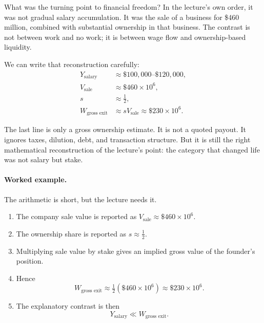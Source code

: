 What was the turning point to financial freedom? In the lecture's own order, it was not gradual salary accumulation. It was the sale of a business for \$460 million, combined with substantial ownership in that business. The contrast is not between work and no work; it is between wage flow and ownership-based liquidity.

We can write that reconstruction carefully:
\begin{align}
Y_{\text{salary}} &\approx \$100{,}000\text{--}\$120{,}000,\\
V_{\text{sale}} &\approx \$460\times 10^6,\\
s &\approx \tfrac12,\\
W_{\text{gross exit}} &\approx sV_{\text{sale}} \approx \$230\times 10^6.
\end{align}

The last line is only a gross ownership estimate. It is not a quoted payout. It ignores taxes, dilution, debt, and transaction structure. But it is still the right mathematical reconstruction of the lecture's point: the category that changed life was not salary but stake.

\paragraph{Worked example.}
The arithmetic is short, but the lecture needs it.
\begin{enumerate}
\item The company sale value is reported as \(V_{\text{sale}} \approx \$460\times 10^6\).
\item The ownership share is reported as \(s \approx \tfrac12\).
\item Multiplying sale value by stake gives an implied gross value of the founder's position.
\item Hence
\[
W_{\text{gross exit}} \approx \tfrac12(\$460\times 10^6) \approx \$230\times 10^6.
\]
\item The explanatory contrast is then
\[
Y_{\text{salary}} \ll W_{\text{gross exit}}.
\]
\end{enumerate}

